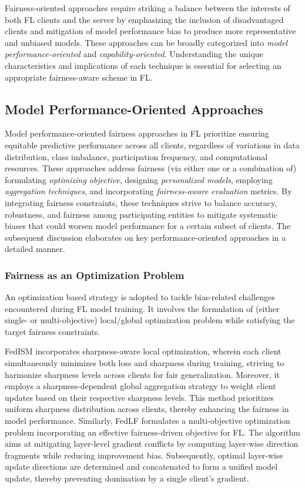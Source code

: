 \documentclass{article}
\begin{document}
Fairness-oriented approaches require striking a balance between the interests of both FL clients and the server by emphasizing the inclusion of disadvantaged clients and mitigation of model performance bias to produce more representative and unbiased models. These approaches can be broadly categorized into {\em model performance-oriented} and {\em capability-oriented}. Understanding the unique characteristics and implications of each technique is essential for selecting an appropriate fairness-aware scheme in FL.  

\subsection{Model Performance-Oriented Approaches}
\label{Sub_sec: Model Performance Oriented Approaches}

Model performance-oriented fairness approaches in FL prioritize ensuring equitable predictive performance across all clients, regardless of variations in data distribution, class imbalance, participation frequency, and computational resources. These approaches address fairness (via either one or a combination of) formulating \emph{optimizing objective}, designing \emph{personalized models}, employing \emph{aggregation techniques}, and incorporating \emph{fairness-aware evaluation} metrics. By integrating fairness constraints, these techniques strive to balance accuracy, robustness, and fairness among participating entities to mitigate systematic biases that could worsen model performance for a certain subset of clients. The subsequent discussion elaborates on key performance-oriented approaches in a detailed manner.

\subsubsection{Fairness as an Optimization Problem}
\label{Subsub_sec: Fairness as Optimization Problem}
An optimization based strategy is adopted to tackle bias-related challenges encountered during FL model training. It involves the formulation of (either single- or multi-objective) local/global optimization problem while satisfying the target fairness constraints.

FedISM \cite{IJCAI_24_Fairness} incorporates sharpness-aware local optimization, wherein each client simultaneously minimizes both loss and sharpness during training, striving to harmonize sharpness levels across clients for fair generalization. Moreover, it employs a sharpness-dependent global aggregation strategy to weight client updates based on their respective sharpness levels. This method prioritizes uniform sharpness distribution across clients, thereby enhancing the fairness in model performance. Similarly, FedLF \cite{FedLF} formulates a multi-objective optimization problem incorporating an effective fairness-driven objective for FL. The algorithm aims at mitigating layer-level gradient conflicts by computing layer-wise direction fragments while reducing improvement bias.  Subsequently, optimal layer-wise update directions are determined and concatenated to form a unified model update, thereby preventing domination by a single client's gradient.
\end{document}
